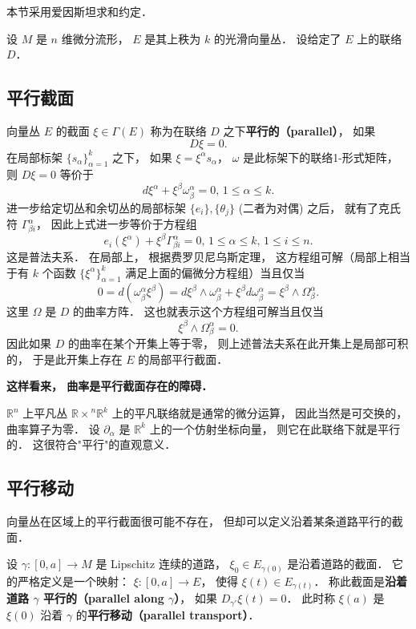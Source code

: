 

本节采用爱因斯坦求和约定．

设 $M$ 是 $n$ 维微分流形， $E$ 是其上秩为 $k$ 的光滑向量丛． 设给定了 $E$ 上的联络 $D$．

\subsection{平行截面}

向量丛 $E$ 的截面 $\xi\in\Gamma(E)$ 称为在联络 $D$ 之下\textbf{平行的（parallel）}， 如果
$$D\xi=0.$$
在局部标架 $\{s_\alpha\}_{\alpha=1}^k$ 之下， 如果 $\xi=\xi^\alpha s_\alpha$， $\omega$ 是此标架下的联络1-形式矩阵， 则 $D\xi=0$ 等价于
$$
d\xi^\alpha+\xi^\beta\omega^\alpha_\beta=0,\,1\leq \alpha\leq k.
$$
进一步给定切丛和余切丛的局部标架 $\{e_i\},\{\theta_j\}$ (二者为对偶) 之后， 就有了克氏符 $\Gamma_{\beta i}^\alpha$， 因此上式进一步等价于方程组
$$
e_i(\xi^\alpha)+\xi^\beta\Gamma^\alpha_{\beta i}=0,\,1\leq \alpha\leq k,\,1\leq i\leq n.
$$
这是普法夫系． 在局部上， 根据费罗贝尼乌斯定理， 这方程组可解（局部上相当于有 $k$ 个函数 $\{\xi^\alpha\}_{\alpha=1}^k$ 满足上面的偏微分方程组）当且仅当
$$
0=d(\omega^\alpha_\beta\xi^\beta)=d\xi^\beta\wedge\omega^\alpha_\beta+\xi^\beta d\omega^\alpha_\beta=\xi^\beta\wedge\Omega_\beta^\alpha.
$$
这里 $\Omega$ 是 $D$ 的曲率方阵． 这也就表示这个方程组可解当且仅当
$$
\xi^\beta\wedge\Omega_\beta^\alpha=0.
$$
因此如果 $D$ 的曲率在某个开集上等于零， 则上述普法夫系在此开集上是局部可积的， 于是此开集上存在 $E$ 的局部平行截面．

\textbf{这样看来， 曲率是平行截面存在的障碍．}

$\mathbb{R}^n$ 上平凡丛 $\mathbb{R\times}^n\mathbb{R}^k$ 上的平凡联络就是通常的微分运算， 因此当然是可交换的， 曲率算子为零． 设 $\partial_\alpha$ 是 $\mathbb{R}^k$ 上的一个仿射坐标向量， 则它在此联络下就是平行的． 这很符合"平行"的直观意义． 

\subsection{平行移动}
向量丛在区域上的平行截面很可能不存在， 但却可以定义沿着某条道路平行的截面． 

设 $\gamma:[0,a]\to M$ 是 Lipschitz 连续的道路， $\xi_0\in E_{\gamma(0)}$ 是沿着道路的截面． 它的严格定义是一个映射： $\xi:[0,a]\to E$， 使得 $\xi(t)\in E_{\gamma(t)}$． 称此截面是\textbf{沿着道路 $\gamma$ 平行的（parallel along $\gamma$）}， 如果 $D_{\gamma'}\xi(t)=0$． 此时称 $\xi(a)$ 是 $\xi(0)$ 沿着 $\gamma$ 的\textbf{平行移动（parallel transport）}．


